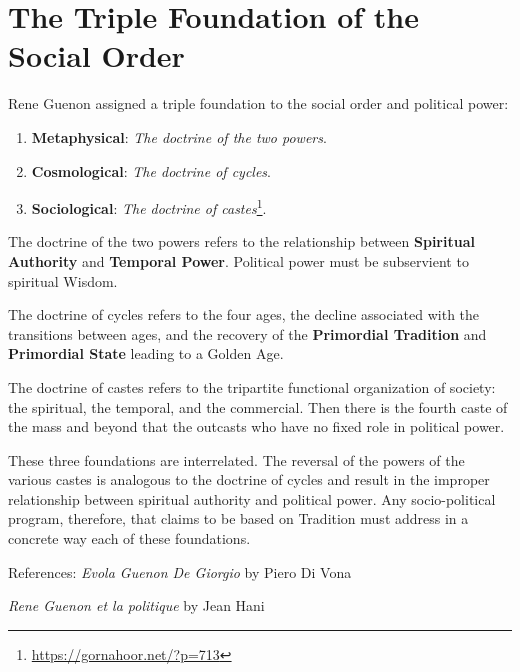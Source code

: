 \section{The Triple Foundation of the Social Order}

Rene Guenon assigned a triple foundation to the social order and political power:

\begin{enumerate}


\item \textbf{Metaphysical}: \emph{The doctrine of the two powers}.


\item \textbf{Cosmological}: \emph{The doctrine of cycles}.


\item \textbf{Sociological}: \emph{The doctrine of castes}\footnote{\url{https://gornahoor.net/?p=713}}.

\end{enumerate}


The doctrine of the two powers refers to the relationship between \textbf{Spiritual Authority} and \textbf{Temporal Power}. Political power must be subservient to spiritual Wisdom.

The doctrine of cycles refers to the four ages, the decline associated with the transitions between ages, and the recovery of the \textbf{Primordial Tradition} and \textbf{Primordial State} leading to a Golden Age.

The doctrine of castes refers to the tripartite functional organization of society: the spiritual, the temporal, and the commercial. Then there is the fourth caste of the mass and beyond that the outcasts who have no fixed role in political power.

These three foundations are interrelated. The reversal of the powers of the various castes is analogous to the doctrine of cycles and result in the improper relationship between spiritual authority and political power. Any socio-political program, therefore, that claims to be based on Tradition must address in a concrete way each of these foundations.

References:
\textit{Evola Guenon De Giorgio} by Piero Di Vona

\textit{Rene Guenon et la politique} by Jean Hani


